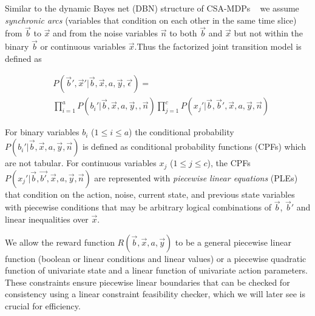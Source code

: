  
Similar to the dynamic Bayes net (DBN) structure of CSA-MDPs ~\cite{sdp_aaai} 
we assume \emph{synchronic arcs} (variables that condition on each
other in the same time slice) from $\vec{b}$ to $\vec{x}$ and from the noise variables $\vec{n}$ to both $\vec{b}$ and $\vec{x}$ but not within the binary $\vec{b}$ or continuous variables $\vec{x}$.Thus the factorized joint transition model is defined as

{\footnotesize
\begin{align}
& P(\vec{b}',\vec{x}'|\vec{b},\vec{x}, a,\vec{y},\vec{\epsilon}) = \nonumber  \\
& %
\prod_{i=1}^a P(b_i'|\vec{b},\vec{x} ,a,\vec{y},,\vec{n}) 
\prod_{j=1}^c P(x_j'|\vec{b},\vec{b}',\vec{x},a,\vec{y},\vec{n})
\end{align}
}

For binary variables $b_i$ ($1 \leq i \leq a$) the conditional probability $P(b_i'|\vec{b},\vec{x},a,\vec{y},\vec{n})$ is defined as 
conditional probability functions (CPFs) which are not tabular.   
For continuous variables $x_j$ ($1 \leq j \leq c$), the CPFs $P(x_j'|\vec{b},\vec{b'},\vec{x},a,\vec{y},\vec{n})$ are represented with \emph{piecewise linear equations} (PLEs) that condition on the action, noise, current state, and previous state variables with piecewise conditions that may be arbitrary logical combinations of $\vec{b}$, $\vec{b}'$  and linear inequalities over $\vec{x}$. %

We allow the reward function $R(\vec{b},\vec{x},a,\vec{y})$ to be a general piecewise linear function (boolean or linear conditions
and linear values) or a piecewise quadratic function of univariate state and a linear function of univariate action parameters. 
These constraints ensure piecewise linear boundaries that can be checked for consistency using a linear constraint feasibility checker, which we will later see is crucial for efficiency.

